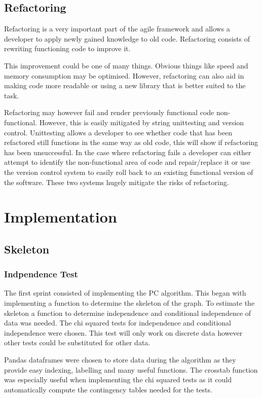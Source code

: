 \documentclass{UoYCSproject}
\begin{document}
\section{Refactoring}
Refactoring is a very important part of the agile framework and allows a developer to apply newly gained knowledge to old code. Refactoring consists of rewriting functioning code to improve it.

This improvement could be one of many things. Obvious things like speed and memory consumption may be optimised. However, refactoring can also aid in making code more readable or using a new library that is better suited to the task.

Refactoring may however fail and render previously functional code non-functional. However, this is easily mitigated by string unittesting and version control. Unittesting allows a developer to see whether code that has been refactored still functions in the same way as old code, this will show if refactoring has been unsuccessful. In the case where refactoring fails a developer can either attempt to identify the non-functional area of code and repair/replace it or use the version control system to easily roll back to an existing functional version of the software. These two systems hugely mitigate the risks of refactoring.

\chapter{Implementation}
\section{Skeleton}
\subsection{Indpendence Test}
The first sprint consisted of implementing the PC algorithm. This began with implementing a function to determine the skeleton of the graph. To estimate the skeleton a function to determine independence and conditional independence of data was needed. The chi squared tests for independence and conditional independence were chosen. This test will only work on discrete data however other tests could be substituted for other data.

Pandas dataframes were chosen to store data during the algorithm as they provide easy indexing, labelling and many useful functions. The crosstab function was especially useful when implementing the chi squared tests as it could automatically compute the contingency tables needed for the tests.
\end{document}
